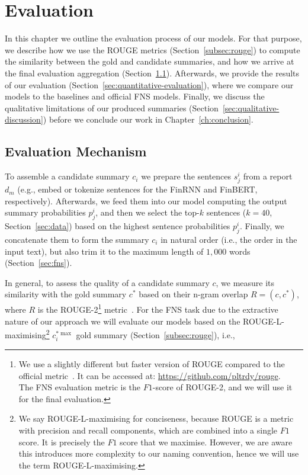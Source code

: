 \chapter{Evaluation}\label{ch:evaluation}
In this chapter we outline the evaluation process of our models.
For that purpose, we describe how we use the ROUGE metrics (Section~\ref{subsec:rouge}) to compute the
similarity between the gold and candidate summaries, and how we arrive at the final evaluation aggregation (Section~\ref{sec:evaluation-mechanism}).
Afterwards, we provide the results of our evaluation (Section~\ref{sec:quantitative-evaluation}), where we compare our models to the baselines and official FNS models.
Finally, we discuss the qualitative limitations of our produced summaries (Section~\ref{sec:qualitative-discussion}) before we conclude our work in Chapter~\ref{ch:conclusion}.

\section{Evaluation Mechanism}\label{sec:evaluation-mechanism}
To assemble a candidate summary $c_{i}$ we prepare the sentences $s_{j}^{i}$ from a report $d_{m}$ (e.g., embed or tokenize sentences for the FinRNN and FinBERT, respectively).
Afterwards, we feed them into our model computing the output summary probabilities $p_{j}^{i}$, and then we select the
top-$k$ sentences ($k=40$, Section~\ref{sec:data}) based on the highest sentence probabilities $p_{j}^{i}$.
Finally, we concatenate them to form the summary $c_{i}$ in natural order (i.e., the order in the input text),
but also trim it to the maximum length of $1,000$ words (Section~\ref{sec:fns}).

In general, to assess the quality of a candidate summary $c$, we measure its similarity with the gold summary $c^{*}$
based on their n-gram overlap $R=(c, c^{*})$, where $R$ is the ROUGE-2\footnote{
        We use a slightly different but faster version of ROUGE compared to the official metric~\cite{lin2004rouge}.
        It can be accessed at: \url{https://github.com/pltrdy/rouge}. \\
        The FNS evaluation metric is the $F1$-score of ROUGE-2, and we will use it for the final evaluation.
} metric~\cite{lin2004rouge}.
For the FNS task due to the extractive nature of our approach we will evaluate our models based on
the ROUGE-L-maximising\footnote{
    We say ROUGE-L-maximising for conciseness, because ROUGE is a metric with precision and recall components, which are combined into a single $F1$ score.
    It is precisely the $F1$ score that we maximise.
    However, we are aware this introduces more complexity to our naming convention, hence we will use the term ROUGE-L-maximising.
} $c^{*\max}_{i}$ gold summary (Section~\ref{subsec:rouge}), i.e.,


